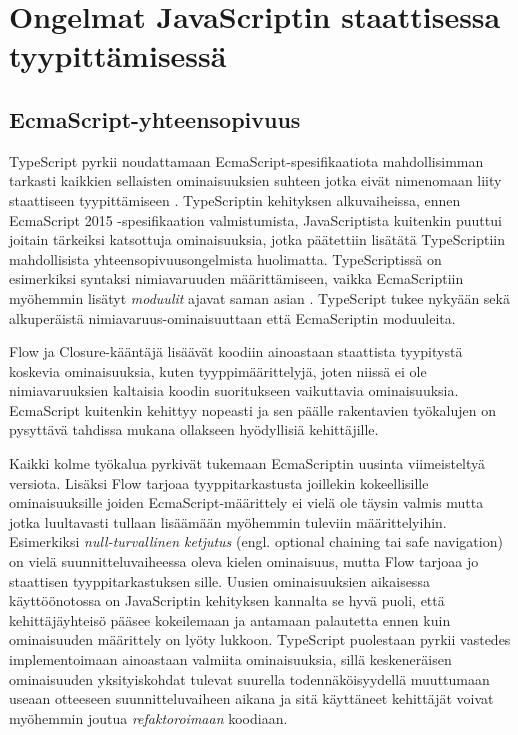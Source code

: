 \chapter{Ongelmat JavaScriptin staattisessa tyypittämisessä}

\section{EcmaScript-yhteensopivuus}
TypeScript pyrkii nou\-dat\-ta\-maan Ecma\-Script-spe\-si\-fi\-kaa\-ti\-o\-ta
mah\-dol\-li\-sim\-man tar\-kas\-ti\newline
kaik\-ki\-en sellaisten ominaisuuksien
suhteen jotka eivät nimenomaan liity staattiseen tyypittämiseen
\cite{TypeScript_DesignGoals}. TypeScriptin kehityksen alkuvaiheissa, ennen
EcmaScript 2015 -spe\-si\-fi\-kaa\-ti\-on valmistumista, JavaScriptista
kuitenkin puuttui joitain tärkeiksi katsottuja ominaisuuksia, jotka
päätettiin lisätätä TypeScriptiin mahdollisista
yh\-teen\-so\-pi\-vuus\-ongel\-mi\-sta huolimatta. TypeScrip\-tis\-sä on
esimerkiksi syntaksi ni\-mi\-a\-va\-ruu\-den määrittämiseen, vaikka
EcmaScriptiin myöhemmin lisätyt \textit{moduulit} ajavat saman asian
\cite{TypeScript_issuecomment_esnextfeatures}. TypeScript tukee nykyään sekä
al\-ku\-pe\-räis\-tä ni\-mi\-a\-va\-ruus-o\-mi\-nai\-suut\-taan että
EcmaScriptin mo\-duu\-lei\-ta.

Flow ja Closure-kääntäjä lisäävät koodiin ainoastaan staattista tyypitystä
koskevia ominaisuuksia, kuten tyyppimäärittelyjä, joten niissä ei ole
nimiavaruuksien kaltaisia koodin suoritukseen vaikuttavia ominaisuuksia.
EcmaScript kuitenkin kehittyy nopeasti ja sen päälle rakentavien työkalujen
on pysyttävä tahdissa mukana ollakseen hyödyllisiä kehittäjille.

Kaikki kolme työkalua pyrkivät tukemaan EcmaScriptin uusinta viimeisteltyä
versiota. Lisäksi Flow tarjoaa tyyppitarkastusta joillekin kokeellisille
ominaisuuksille joiden EcmaScript-määrittely ei vielä ole täysin valmis mutta
jotka luultavasti tullaan lisäämään myöhemmin tuleviin määrittelyihin. Esimerkiksi
\textit{null-turvallinen ketjutus} (engl. optional chaining tai safe navigation)
\cite{Optional_Chaining_proposal} on vielä
suunnitteluvaiheessa oleva kielen ominaisuus, mutta Flow tarjoaa jo
staattisen tyyppitarkastuksen sille. Uusien ominaisuuksien aikaisessa
käyttöönotossa on JavaScriptin kehityksen kannalta se hyvä puoli, että
kehittäjäyhteisö pääsee kokeilemaan ja antamaan palautetta ennen kuin ominaisuuden
määrittely on lyöty lukkoon. TypeScript puolestaan pyrkii vastedes implementoimaan
ainoastaan valmiita ominaisuuksia, sillä keskeneräisen ominaisuuden yksityiskohdat
tulevat suurella todennäköisyydellä muuttumaan useaan otteeseen suunnitteluvaiheen
aikana ja sitä käyttäneet kehittäjät voivat myöhemmin joutua
\textit{refaktoroimaan} koodiaan.

